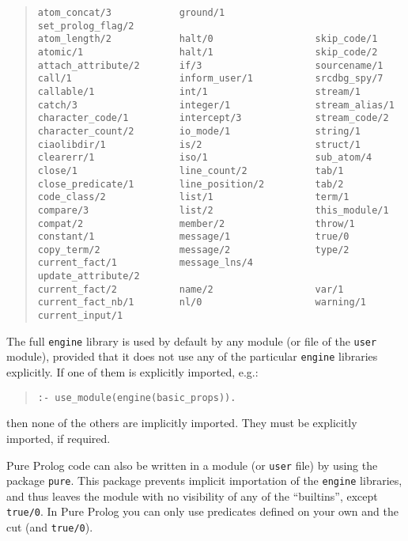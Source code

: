 \begin{quote}
\begin{verbatim}
atom_concat/3            ground/1                set_prolog_flag/2    
atom_length/2            halt/0                  skip_code/1          
atomic/1                 halt/1                  skip_code/2          
attach_attribute/2       if/3                    sourcename/1         
call/1                   inform_user/1           srcdbg_spy/7         
callable/1               int/1                   stream/1             
catch/3                  integer/1               stream_alias/1       
character_code/1         intercept/3             stream_code/2        
character_count/2        io_mode/1               string/1             
ciaolibdir/1             is/2                    struct/1             
clearerr/1               iso/1                   sub_atom/4           
close/1                  line_count/2            tab/1                
close_predicate/1        line_position/2         tab/2                
code_class/2             list/1                  term/1               
compare/3                list/2                  this_module/1        
compat/2                 member/2                throw/1              
constant/1               message/1               true/0               
copy_term/2              message/2               type/2               
current_fact/1           message_lns/4           update_attribute/2   
current_fact/2           name/2                  var/1                
current_fact_nb/1        nl/0                    warning/1            
current_input/1                
\end{verbatim}
\end{quote}

The full \verb+engine+ library is used by default by any module (or file of
the \verb+user+ module), provided that it does not use any of the
particular \verb+engine+ libraries explicitly. If one of them is
explicitly imported, e.g.:
\begin{quote}
\begin{verbatim}
:- use_module(engine(basic_props)).
\end{verbatim}
\end{quote}
%
then none of the others are implicitly imported. They must be
explicitly imported, if required.

Pure Prolog code can also be written in a module (or \verb+user+ file)
by using the package \verb+pure+. This package prevents implicit
importation of the \verb+engine+ libraries, and thus leaves the module
with no visibility of any of the ``builtins'', except
\verb+true/0+. In Pure Prolog you can only use predicates defined on
your own and the cut (and \verb+true/0+).

